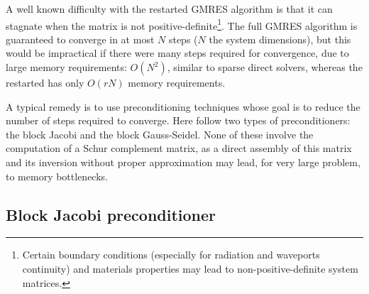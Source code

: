 A well known difficulty with the restarted GMRES algorithm is that it can stagnate
when the matrix is not positive-definite\footnote{Certain boundary conditions (especially for radiation and waveports continuity) and  materials properties may lead to non-positive-definite system matrices.}. The full GMRES algorithm is guaranteed to converge in at most $N$ steps ($N$ the system dimensions), but this would be impractical if there were many steps required for convergence, due to large memory requirements: $O(N^2)$, similar to sparse direct solvers, whereas the restarted has only $O(rN)$ memory requirements. 

A typical remedy is to use preconditioning techniques whose goal is to reduce the number of steps required to converge. Here follow two types of preconditioners: the block Jacobi and the block Gauss-Seidel. None of these involve the computation of a Schur complement matrix, as a direct assembly of this matrix and its inversion without proper approximation may lead, for very large problem, to memory bottlenecks.

\subsection{Block Jacobi preconditioner}\label{sec:JC}

